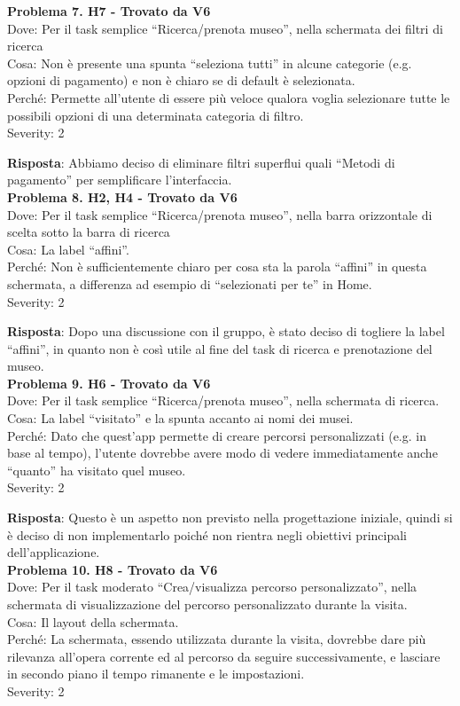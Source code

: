 \documentclass{article}
\begin{document}
\noindent \textbf{Problema 7. H7 - Trovato da V6} \\
Dove: Per il task semplice “Ricerca/prenota museo”, nella schermata dei filtri di ricerca \\
Cosa: Non è presente una spunta “seleziona tutti” in alcune categorie (e.g. opzioni di pagamento) e non è chiaro se di default è selezionata. \\
Perché: Permette all’utente di essere più veloce qualora voglia selezionare tutte le possibili opzioni di una determinata categoria di filtro. \\
Severity: 2

\noindent \textbf{Risposta}: Abbiamo deciso di eliminare filtri superflui quali “Metodi di pagamento” per semplificare l’interfaccia.\\

\noindent \textbf{Problema 8. H2, H4 - Trovato da V6} \\
Dove: Per il task semplice “Ricerca/prenota museo”, nella barra orizzontale di scelta sotto la barra di ricerca \\
Cosa: La label “affini”. \\
Perché: Non è sufficientemente chiaro per cosa sta la parola “affini” in questa schermata, a differenza ad esempio di “selezionati per te” in Home. \\
Severity: 2

\noindent \textbf{Risposta}: Dopo una discussione con il gruppo, è stato deciso di togliere la label “affini”, in quanto non è così utile al fine del task di ricerca e prenotazione del museo.\\

\noindent \textbf{Problema 9. H6 - Trovato da V6} \\
Dove: Per il task semplice “Ricerca/prenota museo”, nella schermata di ricerca. \\
Cosa: La label “visitato” e la spunta accanto ai nomi dei musei. \\
Perché: Dato che quest’app permette di creare percorsi personalizzati (e.g. in base al tempo), l’utente dovrebbe avere modo di vedere immediatamente anche “quanto” ha visitato quel museo. \\
Severity: 2

\noindent \textbf{Risposta}: Questo è un aspetto non previsto nella progettazione iniziale, quindi si è deciso di non implementarlo poiché non rientra negli obiettivi principali dell’applicazione.\\

\noindent \textbf{Problema 10. H8 - Trovato da V6} \\
Dove: Per il task moderato “Crea/visualizza percorso personalizzato”, nella schermata di visualizzazione del percorso personalizzato durante la visita. \\
Cosa: Il layout della schermata. \\
Perché: La schermata, essendo utilizzata durante la visita, dovrebbe dare più rilevanza all’opera corrente ed al percorso da seguire successivamente, e lasciare in secondo piano il tempo rimanente e le impostazioni. \\
Severity: 2
\end{document}
